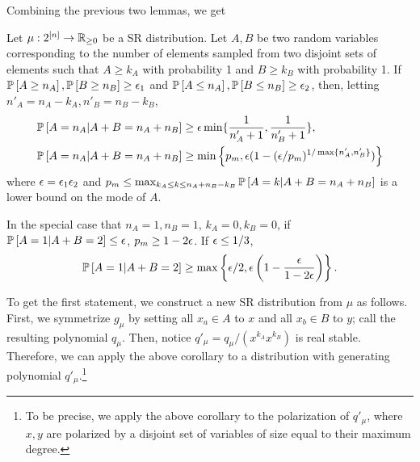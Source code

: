 Combining the previous two lemmas, we get
%

\begin{corollary}\label{lem:SRA=nA}
Let $\mu:2^{[n]}\to\R_{\geq 0}$ be a SR distribution. Let $A,B$ be two random variables corresponding to the number of elements sampled from two disjoint sets of elements such that $A \ge k_A$ with probability 1 and $B \ge k_B$ with probability 1. If $\P{A\geq n_A},\P{B\geq n_B}\geq \eps_1$ and $\P{A\leq n_A},\P{B\leq n_B}\geq \eps_2$, then, letting $n'_A = n_A-k_A, n'_B = n_B-k_B$,
\begin{align*}
	&\P{A=n_A | A+B=n_A+n_B}\geq \eps \min\{\frac1{n'_A+1},\frac{1}{n'_B+1}\},\\
&\P{A=n_A | A+B=n_A+n_B}\geq \min\left\{p_m, \eps(1-(\eps /p_m)^{1/\max\{n'_A,n'_B\}})\right\}
\end{align*}
where $\eps=\eps_1\eps_2$ and $p_m\leq\max_{k_A\leq k\leq n_A+n_B-k_B} \P{A=k | A+B=n_A+n_B}$ is a lower bound on the mode of $A$.

In the special case that $n_A=1,n_B=1$, $k_A=0,k_B=0$,  if   $\P{A=1 | A+B=2} \le \eps$,  $p_m \ge   1-2\eps$. If $\eps\leq 1/3$, 
$$\P{A=1 | A+B=2}\geq  \max\left\{\eps/2, \eps\left(1-\frac{\eps}{1-2\eps}\right)\right\}.$$
\end{corollary}
To get the first statement, we construct a new SR distribution from $\mu$ as follows. First, we symmetrize $g_\mu$ by setting all $x_a \in A$ to $x$ and all $x_b \in B$ to $y$; call the resulting polynomial $q_\mu$. Then, notice $q'_\mu = q_\mu/(x^{k_A}x^{k_B})$ is real stable. Therefore, we can apply the above corollary to a distribution with generating polynomial $q'_\mu$.\footnote{To be precise, we apply the above corollary to the polarization of $q'_\mu$, where $x,y$ are polarized by a disjoint set of variables of size equal to their maximum degree.}

